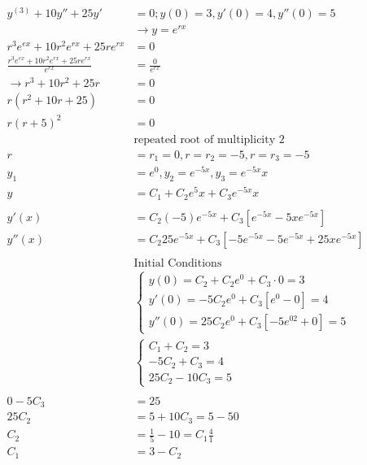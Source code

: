 \documentclass[10pt, letterpaper]{article}
\begin{document}
\begin{align*}
y^{(3)} +10y'' +25y' &=0; y(0)=3, y'(0)=4, y''(0)=5\\
&\rightarrow y=e^{rx}\\
r^3e^{ex} +10r^2e^{rx} +25re^{rx} &=0\\
\frac{r^3e^{ex} +10r^2e^{rx} +25re^{rx}}{e^{rx}} &= \frac{0}{e^{rx}}\\
\rightarrow r^3 +10r^2 +25r &= 0\\
r(r^2 +10r +25) &= 0\\
r(r+5)^2 &= 0\\
&\text{repeated root of multiplicity 2}\\
r &= r_1=0, r=r_2=-5, r=r_3=-5\\
y_1 &= e^0, y_2=e^{-5x}, y_3=e^{-5x}x\\
y &= C_1 +C_2e^5x +C_3e^{-5x}x\\
\\
y'(x) &= C_2(-5)e^{-5x} +C_3[e^{-5x}-5xe^{-5x}]\\
y''(x) &= C_2 25e^{-5x} +C_3[-5e^{-5x}-5e^{-5x} +25xe^{-5x}]\\
\\
&\text{Initial Conditions}\\
&\begin{cases}
	y(0) = C_2 +C_2e^0 +C_3 \cdot 0 =3\\
	y'(0) = -5C_2e^0 +C_3[e^0-0] =4\\
	y''(0) = 25C_2e^0 +C_3[-5e^02+0] =5
\end{cases}\\
&\begin{cases}
	C_1+C_2=3\\
	-5C_2 + C_3 = 4\\
	25C_2 -10C_3 =5
\end{cases}\\
\\
0-5C_3 &= 25\\
25C_2 &= 5+10C_3 = 5-50\\
C_2 &= \frac{1}{5}-10 = C_1\frac{4}{1}\\
C_1 &= 3-C_2
\end{align*}
\end{document}

